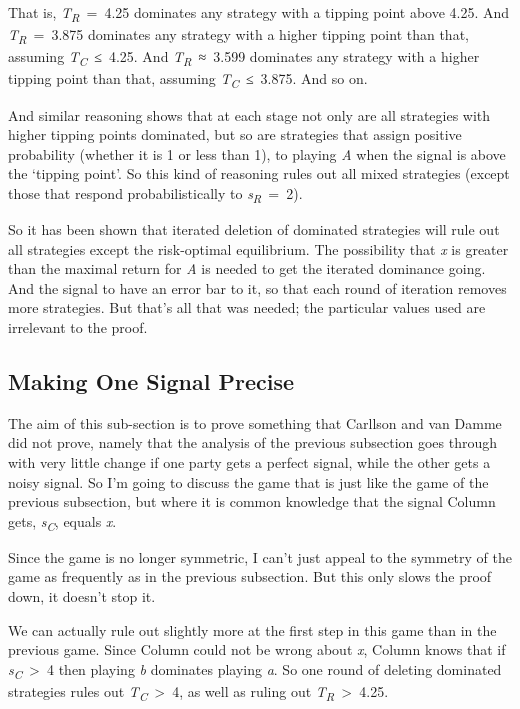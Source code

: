 \documentclass[
  11pt,
]{book}
\begin{document}
That is, \emph{T\textsubscript{R}}~=~4.25 dominates any strategy with a tipping point above 4.25. And \emph{T\textsubscript{R}}~=~3.875 dominates any strategy with a higher tipping point than that, assuming \emph{T\textsubscript{C}}~≤~4.25. And \emph{T\textsubscript{R}}~≈~3.599 dominates any strategy with a higher tipping point than that, assuming \emph{T\textsubscript{C}}~≤~3.875. And so on.

And similar reasoning shows that at each stage not only are all strategies with higher tipping points dominated, but so are strategies that assign positive probability (whether it is 1 or less than 1), to playing \emph{A} when the signal is above the `tipping point'. So this kind of reasoning rules out all mixed strategies (except those that respond probabilistically to \emph{s\textsubscript{R}}~=~2).

So it has been shown that iterated deletion of dominated strategies will rule out all strategies except the risk-optimal equilibrium. The possibility that \emph{x} is greater than the maximal return for \emph{A} is needed to get the iterated dominance going. And the signal to have an error bar to it, so that each round of iteration removes more strategies. But that's all that was needed; the particular values used are irrelevant to the proof.

\hypertarget{perfectri}{%
\subsection{Making One Signal Precise}\label{perfectri}}

The aim of this sub-section is to prove something that Carllson and van Damme did not prove, namely that the analysis of the previous subsection goes through with very little change if one party gets a perfect signal, while the other gets a noisy signal. So I'm going to discuss the game that is just like the game of the previous subsection, but where it is common knowledge that the signal Column gets, \emph{s\textsubscript{C}}, equals \emph{x}.

Since the game is no longer symmetric, I can't just appeal to the symmetry of the game as frequently as in the previous subsection. But this only slows the proof down, it doesn't stop it.

We can actually rule out slightly more at the first step in this game than in the previous game. Since Column could not be wrong about \emph{x}, Column knows that if \emph{s\textsubscript{C}}~\textgreater~4 then playing \emph{b} dominates playing \emph{a}. So one round of deleting dominated strategies rules out \emph{T\textsubscript{C}}~\textgreater~4, as well as ruling out \emph{T\textsubscript{R}}~\textgreater~4.25.
\end{document}
